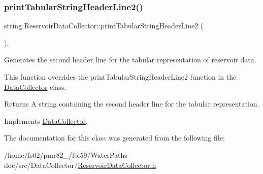 \subsubsection{\texorpdfstring{print\+Tabular\+String\+Header\+Line2()}{printTabularStringHeaderLine2()}}
{\footnotesize\ttfamily string Reservoir\+Data\+Collector\+::print\+Tabular\+String\+Header\+Line2 (\begin{DoxyParamCaption}{ }\end{DoxyParamCaption})\hspace{0.3cm}{\ttfamily [override]}, {\ttfamily [virtual]}}



Generates the second header line for the tabular representation of reservoir data. 

This function overrides the {\ttfamily print\+Tabular\+String\+Header\+Line2} function in the {\ttfamily \mbox{\hyperlink{classDataCollector}{Data\+Collector}}} class.

\begin{DoxyReturn}{Returns}
A string containing the second header line for the tabular representation. 
\end{DoxyReturn}


Implements \mbox{\hyperlink{classDataCollector_af01ea961314be2164f39e6d4cd59e443}{Data\+Collector}}.



The documentation for this class was generated from the following file\+:\begin{DoxyCompactItemize}
\item 
/home/fs02/pmr82\+\_/lbl59/\+Water\+Paths-\/doc/src/\+Data\+Collector/\mbox{\hyperlink{ReservoirDataCollector_8h}{Reservoir\+Data\+Collector.\+h}}\end{DoxyCompactItemize}
